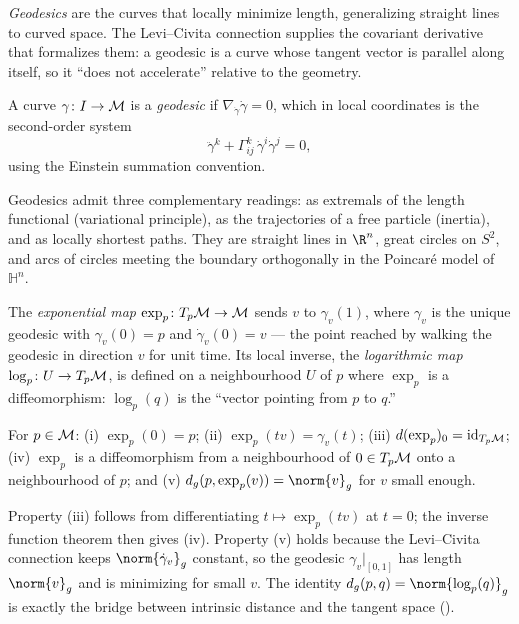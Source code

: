 \emph{Geodesics} are the curves that locally minimize length, generalizing
straight lines to curved space. The Levi--Civita connection supplies the
covariant derivative that formalizes them: a geodesic is a curve whose tangent
vector is parallel along itself, so it ``does not accelerate'' relative to the
geometry.

\begin{definition}[Geodesic]
\label{def:geo:geodesic}
A curve $\gamma \colon I \to \mathcal{M}$ is a \emph{geodesic} if
$\nabla_{\dot\gamma}\dot\gamma = 0$, which in local coordinates is the
second-order system
\[
  \ddot\gamma^k + \Gamma^k_{ij}\, \dot\gamma^i \dot\gamma^j = 0 ,
\]
using the Einstein summation convention.
\end{definition}

Geodesics admit three complementary readings: as extremals of the length
functional (variational principle), as the trajectories of a free particle
(inertia), and as locally shortest paths. They are straight lines in $\R^n$,
great circles on $S^2$, and arcs of circles meeting the boundary orthogonally in
the Poincar\'e model of $\mathbb{H}^n$.

\begin{definition}
\label{def:geo:exp-log}
The \emph{exponential map} $\exp_p \colon T_p\mathcal{M} \to \mathcal{M}$ sends $v$ to
$\gamma_v(1)$, where $\gamma_v$ is the unique geodesic with $\gamma_v(0) = p$ and
$\dot\gamma_v(0) = v$ --- the point reached by walking the geodesic in direction
$v$ for unit time. Its local inverse, the \emph{logarithmic map}
$\log_p \colon U \to T_p\mathcal{M}$, is defined on a neighbourhood $U$ of $p$ where
$\exp_p$ is a diffeomorphism: $\log_p(q)$ is the ``vector pointing from $p$ to
$q$.''
\end{definition}

\begin{proposition}
\label{prop:geo:exp}
For $p \in \mathcal{M}$: (i) $\exp_p(0) = p$; (ii) $\exp_p(tv) = \gamma_v(t)$; (iii)
$d(\exp_p)_0 = \operatorname{id}_{T_p\mathcal{M}}$; (iv) $\exp_p$ is a diffeomorphism from
a neighbourhood of $0 \in T_p\mathcal{M}$ onto a neighbourhood of $p$; and (v)
$d_g(p, \exp_p(v)) = \norm{v}_g$ for $v$ small enough.
\end{proposition}

Property (iii) follows from differentiating $t \mapsto \exp_p(tv)$ at $t = 0$;
the inverse function theorem then gives (iv). Property (v) holds because the
Levi--Civita connection keeps $\norm{\dot\gamma_v}_g$ constant, so the geodesic
$\gamma_v|_{[0,1]}$ has length $\norm{v}_g$ and is minimizing for small $v$. The
identity $d_g(p,q) = \norm{\log_p(q)}_g$ is exactly the bridge between intrinsic
distance and the tangent space ().

